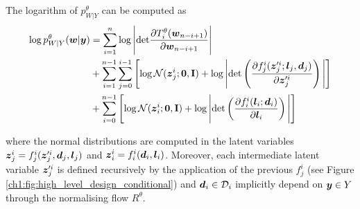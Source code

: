 \begin{proposition}
    The logarithm of $p^\theta_{W|Y}$ can be computed as
    \begin{align}
    \log p^\theta_{W|Y}(\boldsymbol{w} | \boldsymbol{y})   & = \sum_{i=1}^{n}\log{\Bigg|{\rm det}\frac{\partial T_i^{\theta}(\boldsymbol{w}_{n-i+1})}{\partial \boldsymbol{w}_{n-i+1}}\Bigg|} \nonumber \\ 
    & + \sum_{i=1}^{n-1} \sum^{i-1}_{j=0} \left[\log \mathcal{N}(\boldsymbol{z}_j^i;\textbf{0},\textbf{I})+\log \Bigg|{\rm det}\left(\frac{\partial f^i_{j}(\boldsymbol{z}_j^{\prime i};\boldsymbol{l}_j,\boldsymbol{d}_{j})}{\partial \boldsymbol{z}_j^{\prime i}}\right)\Bigg|\right] \nonumber\\
    & + \sum_{i=0}^{n-1}  \left[\log \mathcal{N}(\boldsymbol{z}_i^i;\textbf{0},\textbf{I})+\log \Bigg|{\rm det}\left(\frac{\partial f^i_{i}(\boldsymbol{l}_{i};\boldsymbol{d}_{i})}{\partial \boldsymbol{l}_{i}}\right)\Bigg|\right]\label{ch1:eq:obj}
    \end{align} 
    
    where the normal distributions are computed in the latent variables $\boldsymbol{z}_j^i = f_j^i(\boldsymbol{z}_j^{\prime i}, \boldsymbol{d}_j,\boldsymbol{l}_j)$ and $\boldsymbol{z}_i^i = f_i^i( \boldsymbol{d}_i,\boldsymbol{l}_i)$. Moreover, each intermediate latent variable $\boldsymbol{z}_j^{\prime i}$ is defined recursively by the application of the previous $f_j^i$ (see Figure \ref{ch1:fig:high_level_design_conditional}) and ${\boldsymbol{d}}_{i} \in \mathcal{D}_{i}$ implicitly depend on $\boldsymbol{y} \in Y$ through the normalising flow $R^\theta$. 
    
\end{proposition}

